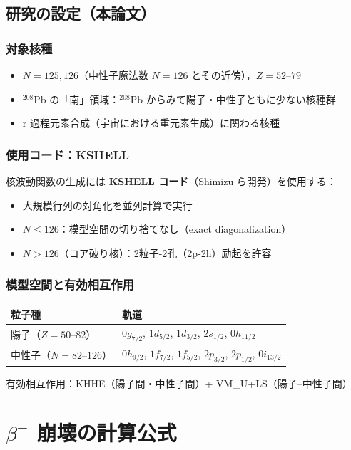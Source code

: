 \documentclass[12pt,a4paper]{ltjsarticle}
\begin{document}
\subsection{研究の設定（本論文）}

\subsubsection{対象核種}
\begin{itemize}
  \item $N = 125, 126$（中性子魔法数 $N=126$ とその近傍），$Z = 52$--$79$
  \item $^{208}$Pb の「南」領域：$^{208}$Pb からみて陽子・中性子ともに少ない核種群
  \item r 過程元素合成（宇宙における重元素生成）に関わる核種
\end{itemize}

\subsubsection{使用コード：KSHELL}
核波動関数の生成には \textbf{KSHELL コード}（Shimizu ら開発）を使用する：
\begin{itemize}
  \item 大規模行列の対角化を並列計算で実行
  \item $N \leq 126$：模型空間の切り捨てなし（exact diagonalization）
  \item $N > 126$（コア破り核）：2粒子-2孔（2p-2h）励起を許容
\end{itemize}

\subsubsection{模型空間と有効相互作用}
\begin{center}
\begin{tabular}{ll}
\toprule
粒子種 & 軌道 \\
\midrule
陽子（$Z=50$--$82$） & $0g_{7/2}$, $1d_{5/2}$, $1d_{3/2}$, $2s_{1/2}$, $0h_{11/2}$ \\
中性子（$N=82$--$126$） & $0h_{9/2}$, $1f_{7/2}$, $1f_{5/2}$, $2p_{3/2}$, $2p_{1/2}$, $0i_{13/2}$ \\
\bottomrule
\end{tabular}
\end{center}
有効相互作用：KHHE（陽子間・中性子間）+ VM\_U+LS（陽子--中性子間）

\section{$\beta^-$ 崩壊の計算公式}
\end{document}
